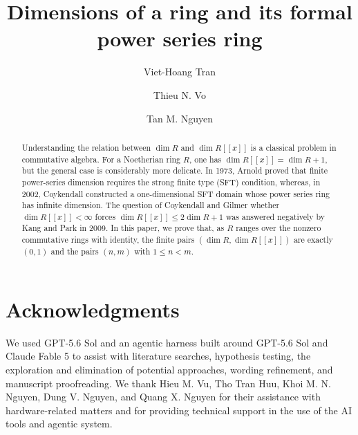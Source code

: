 \documentclass[11pt,reqno]{amsart}
\title[Dimensions of a ring and its power series ring]
  {Dimensions of a ring and its formal power series ring}
\author{Viet-Hoang Tran}
\author{Thieu N. Vo}
\author{Tan M. Nguyen}
\numberwithin{equation}{section}
\theoremstyle{plain}
\theoremstyle{definition}
\theoremstyle{remark}
\begin{document}
\raggedbottom

\begin{abstract}
Understanding the relation between $\dim R$ and $\dim R[[x]]$ is a classical problem in commutative algebra. For a Noetherian ring $R$, one has $\dim R[[x]]=\dim R+1$, but the general case is considerably more delicate. In 1973, Arnold proved that finite power-series dimension requires the strong finite type (SFT) condition, whereas, in 2002, Coykendall constructed a one-dimensional SFT domain whose power series ring has infinite dimension. The question of Coykendall and Gilmer whether $\dim R[[x]]<\infty$ forces $\dim R[[x]]\le2\dim R+1$ was answered negatively by Kang and Park in 2009. In this paper, we prove that, as $R$ ranges over the  nonzero commutative rings with identity, the finite pairs $(\dim R,\dim R[[x]])$ are exactly $(0,1)$ and the pairs $(n,m)$ with $1\le n<m$.
\end{abstract}


\maketitle
\enlargethispage{3pt}







\renewcommand{\sectionname}{}
\section*{Acknowledgments}
We used GPT-5.6 Sol and an agentic harness built around GPT-5.6 Sol and Claude Fable 5 to assist with literature searches, hypothesis testing, the exploration and elimination of potential approaches, wording refinement, and manuscript proofreading. We thank Hieu M. Vu, Tho Tran Huu, Khoi M. N. Nguyen, Dung V. Nguyen, and Quang X. Nguyen for their assistance with hardware-related matters and for providing technical support in the use of the AI tools and agentic system. %


\end{document}
